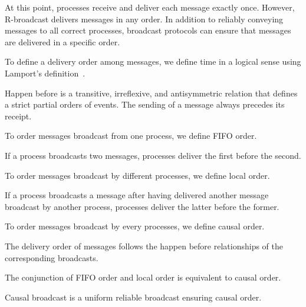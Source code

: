 At this point, processes receive and deliver each message exactly once. However,
R-broadcast delivers messages in any order.  In addition to reliably conveying
messages to all correct processes, broadcast protocols can ensure that messages
are delivered in a specific order.

To define a delivery order among messages, we define time in a logical sense
using Lamport's definition~\cite{lamport1978time}.

\begin{definition}
  Happen before is a transitive, irreflexive, and antisymmetric relation that
  defines a strict partial orders of events.  The sending of a message always
  precedes its receipt.
\end{definition}

To order messages broadcast from one process, we define FIFO order.

\begin{definition}
  If a process broadcasts two messages, processes deliver the first before the
  second.
\end{definition}

To order messages broadcast by different processes, we define local order.

\begin{definition}
  If a process broadcasts a message after having delivered another message
  broadcast by another process, processes deliver the latter before the former.
\end{definition}

To order messages broadcast by every processes, we define causal order.

\begin{definition}
  The delivery order of messages follows the happen before relationships of the
  corresponding broadcasts.
\end{definition}

\begin{theorem}
  The conjunction of FIFO order and local order is equivalent to causal order.
\end{theorem}

\begin{definition}
  Causal broadcast is a uniform reliable broadcast ensuring causal order.
\end{definition}


